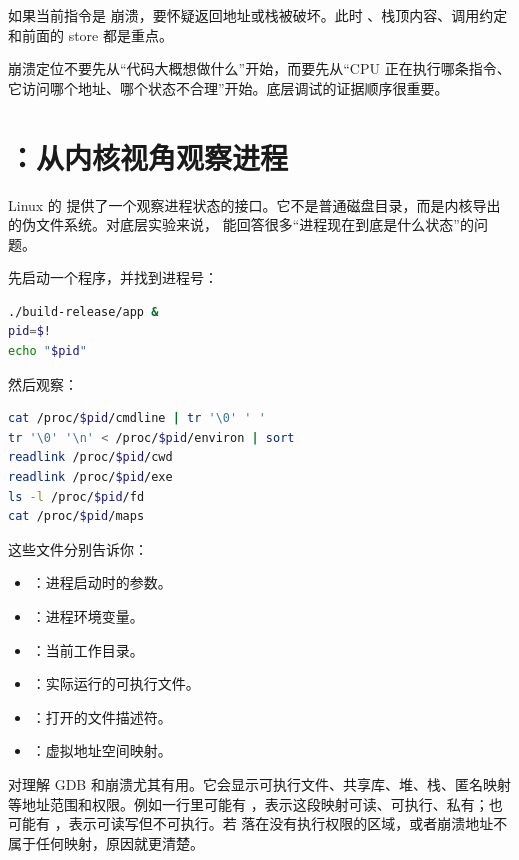 如果当前指令是  崩溃，要怀疑返回地址或栈被破坏。此时 、栈顶内容、调用约定和前面的 store 都是重点。

\begin{warningbox}
崩溃定位不要先从“代码大概想做什么”开始，而要先从“CPU 正在执行哪条指令、它访问哪个地址、哪个状态不合理”开始。底层调试的证据顺序很重要。
\end{warningbox}

\section{：从内核视角观察进程}

Linux 的  提供了一个观察进程状态的接口。它不是普通磁盘目录，而是内核导出的伪文件系统。对底层实验来说， 能回答很多“进程现在到底是什么状态”的问题。

先启动一个程序，并找到进程号：

\begin{lstlisting}[language=bash]
./build-release/app &
pid=$!
echo "$pid"
\end{lstlisting}

然后观察：

\begin{lstlisting}[language=bash]
cat /proc/$pid/cmdline | tr '\0' ' '
tr '\0' '\n' < /proc/$pid/environ | sort
readlink /proc/$pid/cwd
readlink /proc/$pid/exe
ls -l /proc/$pid/fd
cat /proc/$pid/maps
\end{lstlisting}

这些文件分别告诉你：

\begin{itemize}
  \item {}：进程启动时的参数。
  \item {}：进程环境变量。
  \item {}：当前工作目录。
  \item {}：实际运行的可执行文件。
  \item {}：打开的文件描述符。
  \item {}：虚拟地址空间映射。
\end{itemize}

 对理解 GDB 和崩溃尤其有用。它会显示可执行文件、共享库、堆、栈、匿名映射等地址范围和权限。例如一行里可能有 ，表示这段映射可读、可执行、私有；也可能有 ，表示可读写但不可执行。若  落在没有执行权限的区域，或者崩溃地址不属于任何映射，原因就更清楚。

